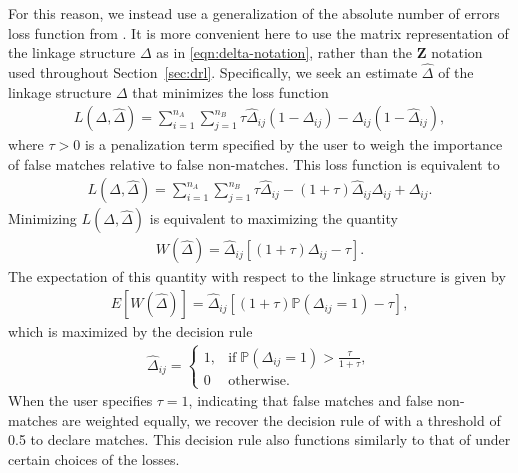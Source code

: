 \documentclass[12pt,letterpaper]{article}
\newcommand{\1}[1]{\mathbb{I}\!\left[#1\right]} %
\begin{document}
For this reason, we instead use a generalization of the absolute number of errors loss function from \cite{Tancredi_2011}. It is more convenient here to use the matrix representation of the linkage structure $\Delta$ as in \eqref{eqn:delta-notation}, rather than the $\bm{Z}$ notation used throughout Section~\ref{sec:drl}. Specifically, we seek an estimate $\hat{\Delta}$ of the linkage structure $\Delta$ that minimizes the loss function
\begin{align*}%
	L(\Delta, \hat{\Delta}) = \sum_{i = 1}^{n_A}\sum_{j = 1}^{n_B}\tau \hat{\Delta}_{ij}(1 - \Delta_{ij}) - \Delta_{ij}(1 - \hat{\Delta}_{ij}),
\end{align*}
where $\tau > 0 $ is a penalization term specified by the user to weigh the importance of false matches relative to false non-matches. This loss function is equivalent to 
\begin{align*}
	L(\Delta, \hat{\Delta}) = \sum_{i = 1}^{n_A}\sum_{j = 1}^{n_B}\tau \hat{\Delta}_{ij} - (1 + \tau)\hat{\Delta}_{ij}\Delta_{ij} + \Delta_{ij}.
\end{align*}
Minimizing $L(\Delta, \hat{\Delta})$ is equivalent to maximizing the quantity
\begin{align*}
	W(\hat{\Delta}) = \hat{\Delta}_{ij}[(1 + \tau) \Delta_{ij} - \tau].
\end{align*}
The expectation of this quantity with respect to the linkage structure is given by 
\begin{align*}
	E[W(\hat{\Delta})] =\hat{\Delta}_{ij}[(1 + \tau) \mathbb{P}(\Delta_{ij} = 1) - \tau],
\end{align*}
which is maximized by the decision rule
\begin{align}\label{eqn:decision-rule}
	\hat{\Delta}_{ij} = \begin{cases}
		1,  &  \text{if}  \; \mathbb{P}(\Delta_{ij} = 1) > \frac{\tau}{1 + \tau},\\
		0 &   \text{otherwise}.
	\end{cases}
\end{align}
When the user specifies $\tau = 1$, indicating that false matches and false non-matches are weighted equally, we recover the decision rule of \cite{Tancredi_2011} with a threshold of 0.5 to declare matches. This decision rule also functions similarly to that of \cite{sadinle_bayesian_2017} under certain choices of the losses. 
\end{document}
